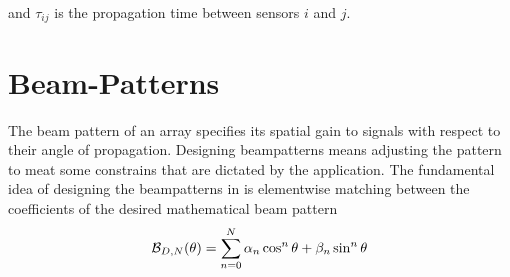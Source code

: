 \documentclass{article}
\begin{document}
and  $ \tau_{ij} $ is the propagation time between sensors $ i $ and $ j $. %

\section{Beam-Patterns}
\label{sec:Beam-Patterns}
The beam pattern of an array specifies its spatial gain to signals with respect to their angle of propagation. Designing beampatterns means adjusting the pattern to meat some constrains that are dictated by the application. 
The fundamental idea of designing the beampatterns in \cite{sps17} is elementwise matching between the coefficients of the desired mathematical beam pattern 
\begin{equation}
{\cal B}_{D,N}(\theta)=\sum_{n=0}^{N}\alpha_n\cos^n{\theta}+\beta_n\sin^n{\theta} 
\end{equation} 
\end{document}
